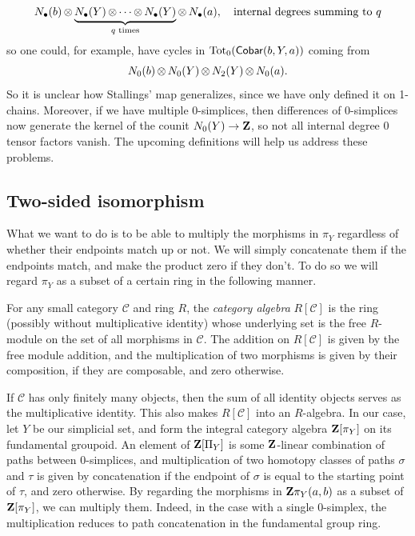 \[N_\bullet(b) \operatorname{\otimes} \underbrace{N_\bullet(Y) \operatorname{\otimes} \cdots \operatorname{\otimes} N_\bullet(Y)}_{\text{$q$ times}} \operatorname{\otimes} N_\bullet(a),\quad \text{internal degrees summing to $q$}\]
so one could, for example, have cycles in $\operatorname{Tot}_0(\operatorname{\mathsf{Cobar}}(b,Y,a))$ coming from
\[N_0(b) \operatorname{\otimes} N_0(Y)\operatorname{\otimes} N_2(Y)\operatorname{\otimes} N_0(a).\]
So it is unclear how Stallings' map generalizes, since we have only defined it on 1-chains. Moreover, if we have multiple 0-simplices, then differences of 0-simplices now generate the kernel of the counit $N_0(Y) \to \mathbf{Z}$, so not all internal degree 0 tensor factors vanish. The upcoming definitions will help us address these problems.

\subsection{Two-sided isomorphism} What we want to do is to be able to multiply the morphisms in $\pi_Y$ regardless of whether their endpoints match up or not. We will simply concatenate them if the endpoints match, and make the product zero if they don't. To do so we will regard $\pi_Y$ as a subset of a certain ring in the following manner.
\begin{defn}
For any small category $\mathcal{C}$ and ring $R$, the \emph{category algebra} $R[\mathcal{C}]$ is the ring (possibly without multiplicative identity) whose underlying set is the free $R$-module on the set of all morphisms in $\mathcal{C}$. The addition on $R[\mathcal{C}]$ is given by the free module addition, and the multiplication of two morphisms is given by their composition, if they are composable, and zero otherwise. 
\end{defn}
If $\mathcal{C}$ has only finitely many objects, then the sum of all identity objects serves as the multiplicative identity. This also makes $R[\mathcal{C}]$ into an $R$-algebra. In our case, let $Y$ be our simplicial set, and form the integral category algebra $\mathbf{Z}[\pi_Y]$ on its fundamental groupoid. An element of $\mathbf{Z}[\Pi_Y]$ is some $\mathbf{Z}$-linear combination of paths between 0-simplices, and multiplication of two homotopy classes of paths $\sigma$ and $\tau$ is given by concatenation if the endpoint of $\sigma$ is equal to the starting point of $\tau$, and zero otherwise. By regarding the morphisms in $\mathbf{Z}\pi_Y(a,b)$ as a subset of $\mathbf{Z}[\pi_Y]$, we can multiply them. Indeed, in the case with a single 0-simplex, the multiplication reduces to path concatenation in the fundamental group ring.

